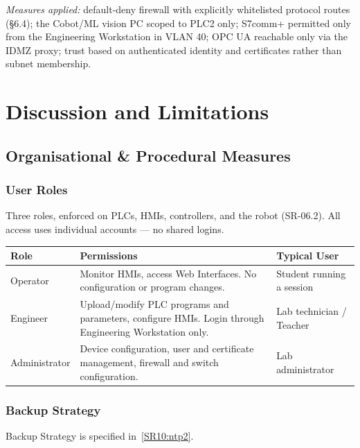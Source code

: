 \documentclass{report}
\begin{document}
\textit{Measures applied:} default-deny firewall with explicitly whitelisted protocol routes (\S6.4); the Cobot/ML vision PC scoped to PLC2 only; S7comm+ permitted only from the Engineering Workstation in VLAN 40; OPC UA reachable only via the IDMZ proxy; trust based on authenticated identity and certificates rather than subnet membership.

\chapter{Discussion and Limitations}\label{chap:9-discussion}

\section{Organisational \& Procedural Measures}

\subsection{User Roles}
Three roles, enforced on PLCs, HMIs, controllers, and the robot (SR-06.2). All access uses individual accounts — no shared logins.

\renewcommand{\arraystretch}{1.3} %
\begin{tabularx}{\textwidth}{p{2.5cm} X X}
    \textbf{Role} & \textbf{Permissions} & \textbf{Typical User} \vspace{0.5em}\\
\toprule
    Operator & Monitor HMIs, access Web Interfaces. No configuration or program changes. & Student running a session \\
    \midrule
    Engineer & Upload/modify PLC programs and parameters, configure HMIs. Login through Engineering Workstation only. & Lab technician / Teacher \\
    \midrule
    Administrator &  Device configuration, user and certificate management, firewall and switch configuration. &  Lab administrator \\
    \bottomrule
\end{tabularx}
\vspace{1em}

\subsection{Backup Strategy}
Backup Strategy is specified in~\ref{SR10:ntp2}.
\end{document}
